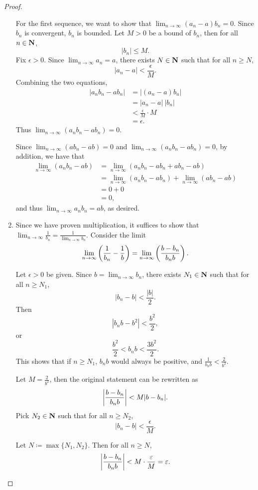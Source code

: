 \begin{proof}
\begin{enumerate}[label=(\arabic*)]
For the first sequence, we want to show that $\displaystyle\lim_{n\to\infty}(a_n-a)b_n=0$. Since $b_n$ is convergent, $b_n$ is bounded. Let $M>0$ be a bound of $b_n$, then for all $n\in\mathbf N$,
\[|b_n|\le M.\]
Fix $\epsilon>0$. Since $\displaystyle\lim_{n\to\infty}a_n=a$, there exists $N\in\mathbf N$ such that for all $n\ge N$,
\[|a_n-a|<\frac{\epsilon}{M}.\]
Combining the two equations,
\begin{align*}
|a_nb_n-ab_n|
&=|(a_n-a)b_n|\\
&=|a_n-a|\:|b_n|\\
&<\frac{\epsilon}{M}\cdot M\\
&=\epsilon.
\end{align*}
Thus $\displaystyle\lim_{n\to\infty}(a_nb_n-ab_n)=0$.

Since $\displaystyle\lim_{n\to\infty}(ab_n-ab)=0$ and $\displaystyle\lim_{n\to\infty}(a_nb_n-ab_n)=0$, by addition, we have that
\begin{align*}
\lim_{n\to\infty}(a_nb_n-ab)
&=\lim_{n\to\infty}(a_nb_n-ab_n+ab_n-ab)\\
&=\lim_{n\to\infty}(a_nb_n-ab_n)+\lim_{n\to\infty}(ab_n-ab)\\
&=0+0\\
&=0,
\end{align*}
and thus $\displaystyle\lim_{n\to\infty}a_nb_n=ab$, as desired.

\item Since we have proven multiplication, it suffices to show that $\displaystyle\lim_{n\to\infty}\frac{1}{b_n}=\frac{1}{\lim_{n\to\infty} b_n}$. Consider the limit
\[\lim_{n\to\infty}\left(\frac{1}{b_n}-\frac{1}{b}\right)=\lim_{n\to\infty}\left(\frac{b-b_n}{b_nb}\right). \]

Let $\epsilon>0$ be given. Since $\displaystyle b=\lim_{n\to\infty}b_n$, there exists $N_1\in\mathbf N$ such that for all $n\ge N_1$,
\[|b_n-b|<\frac{|b|}{2}.\]
Then
\[|b_nb-b^2|<\frac{b^2}{2},\]
or
\[\frac{b^2}{2}<b_nb<\frac{3b^2}{2}.\]
This shows that if $n\ge N_1$, $b_nb$ would always be positive, and $\frac{1}{b_nb}<\frac{2}{b^2}$.

Let $M=\frac{2}{b^2}$, then the original statement can be rewritten as
\[\left|\frac{b-b_n}{b_nb}\right|<M|b-b_n|.\]
Pick $N_2\in\mathbf N$ such that for all $n\ge N_2$,
\[|b_n-b|<\frac{\epsilon}{M}.\]

Let $N\coloneqq\max\{N_1,N_2\}$. Then for all $n\ge N$,
\[ \left|\frac{b-b_n}{b_nb}\right|<M\cdot\frac{\varepsilon}{M}=\varepsilon. \]
\end{enumerate}
\end{proof}

